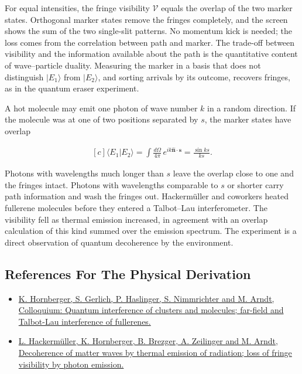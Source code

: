 \documentclass[11pt,oneside]{book}
\newenvironment{centeredalign}{\[\begin{gathered}[c]}{\end{gathered}\]}
\newcommand{\ket}[1]{\lvert #1\rangle}
\begin{document}
For equal intensities, the fringe visibility \(\mathcal V\) equals the overlap of the two marker states. Orthogonal marker states remove the fringes completely, and the screen shows the sum of the two single-slit patterns. No momentum kick is needed; the loss comes from the correlation between path and marker. The trade-off between visibility and the information available about the path is the quantitative content of wave--particle duality. Measuring the marker in a basis that does not distinguish \(\ket{E_1}\) from \(\ket{E_2}\), and sorting arrivals by its outcome, recovers fringes, as in the quantum eraser experiment.

A hot molecule may emit one photon of wave number \(k\) in a random direction. If the molecule was at one of two positions separated by \(s\), the marker states have overlap

\begin{centeredalign}
\langle E_1|E_2\rangle=\int\frac{d\Omega}{4\pi}\,e^{ik\hat{\mathbf n}\cdot\mathbf s}=\frac{\sin ks}{ks}.
\end{centeredalign}

Photons with wavelengths much longer than \(s\) leave the overlap close to one and the fringes intact. Photons with wavelengths comparable to \(s\) or shorter carry path information and wash the fringes out. Hackermüller and coworkers heated fullerene molecules before they entered a Talbot--Lau interferometer. The visibility fell as thermal emission increased, in agreement with an overlap calculation of this kind summed over the emission spectrum. The experiment is a direct observation of quantum decoherence by the environment.

\subsection*{References For The Physical Derivation}
\begin{itemize}
\item \href{https://arxiv.org/abs/1109.5937}{K. Hornberger, S. Gerlich, P. Haslinger, S. Nimmrichter and M. Arndt, Colloquium: Quantum interference of clusters and molecules; far-field and Talbot-Lau interference of fullerenes.}
\item \href{https://arxiv.org/abs/quant-ph/0402146}{L. Hackermüller, K. Hornberger, B. Brezger, A. Zeilinger and M. Arndt, Decoherence of matter waves by thermal emission of radiation; loss of fringe visibility by photon emission.}
\end{itemize}
\end{document}
